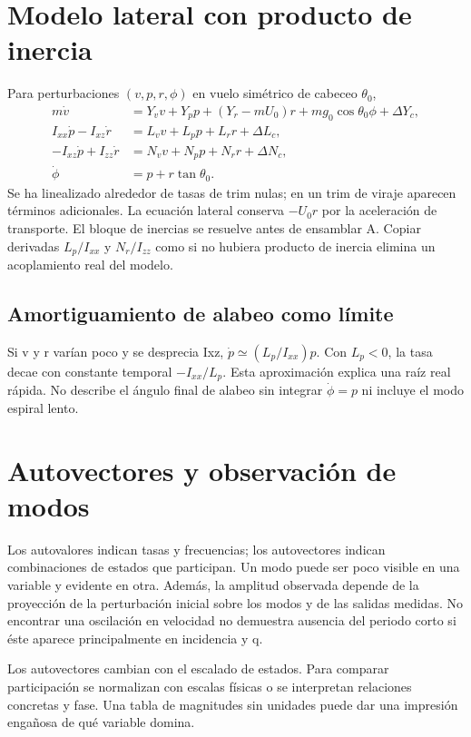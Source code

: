 \section{Modelo lateral con producto de inercia}
Para perturbaciones $(v,p,r,\phi)$ en vuelo simétrico de cabeceo $\theta_0$,
\begin{align}
m\dot v&=Y_vv+Y_pp+(Y_r-mU_0)r+mg_0\cos\theta_0\phi+\Delta Y_c,\\
I_{xx}\dot p-I_{xz}\dot r&=L_vv+L_pp+L_rr+\Delta L_c,\\
-I_{xz}\dot p+I_{zz}\dot r&=N_vv+N_pp+N_rr+\Delta N_c,\\
\dot\phi&=p+r\tan\theta_0.
\end{align}
Se ha linealizado alrededor de tasas de trim nulas; en un trim de viraje aparecen términos adicionales. La ecuación lateral conserva $-U_0r$ por la aceleración de transporte. El bloque de inercias se resuelve antes de ensamblar A. Copiar derivadas $L_p/I_{xx}$ y $N_r/I_{zz}$ como si no hubiera producto de inercia elimina un acoplamiento real del modelo.

\subsection{Amortiguamiento de alabeo como límite}
Si v y r varían poco y se desprecia Ixz, $\dot p\simeq(L_p/I_{xx})p$. Con $L_p<0$, la tasa decae con constante temporal $-I_{xx}/L_p$. Esta aproximación explica una raíz real rápida. No describe el ángulo final de alabeo sin integrar $\dot\phi=p$ ni incluye el modo espiral lento.

\section{Autovectores y observación de modos}
Los autovalores indican tasas y frecuencias; los autovectores indican combinaciones de estados que participan. Un modo puede ser poco visible en una variable y evidente en otra. Además, la amplitud observada depende de la proyección de la perturbación inicial sobre los modos y de las salidas medidas. No encontrar una oscilación en velocidad no demuestra ausencia del periodo corto si éste aparece principalmente en incidencia y q.

Los autovectores cambian con el escalado de estados. Para comparar participación se normalizan con escalas físicas o se interpretan relaciones concretas y fase. Una tabla de magnitudes sin unidades puede dar una impresión engañosa de qué variable domina.


